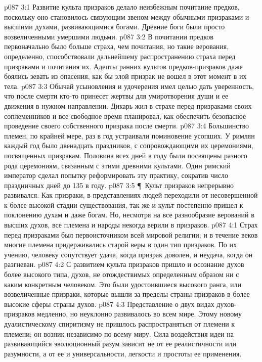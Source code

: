 \vs p087 3:1 Развитие культа призраков делало неизбежным почитание предков, поскольку оно становилось связующим звеном между обычными призраками и высшими духами, развивающимися богами. Древние боги были просто возвеличенными умершими людьми.
\vs p087 3:2 В почитании предков первоначально было больше страха, чем почитания, но такие верования, определенно, способствовали дальнейшему распространению страха перед призраками и почитания их. Адепты ранних культов предков\hyp{}призраков даже боялись зевать из опасения, как бы злой призрак не вошел в этот момент в их тела.
\vs p087 3:3 Обычай усыновления и удочерения имел целью дать уверенность, что после смерти кто\hyp{}то принесет жертвы для умиротворения души и ее движения в нужном направлении. Дикарь жил в страхе перед призраками своих соплеменников и все свободное время планировал, как обеспечить безопасное проведение своего собственного призрака после смерти.
\vs p087 3:4 Большинство племен, по крайней мере, раз в год устраивали поминовение усопших. У римлян каждый год было двенадцать праздников, с сопровождающими их церемониями, посвященных призракам. Половина всех дней в году были посвящены разного рода церемониям, связанным с этими древними культами. Один римский император сделал попытку реформировать эту практику, сократив число праздничных дней до 135 в году.
\vs p087 3:5 \P\ Культ призраков непрерывно развивался. Как призраки, в представлениях людей переходили от несовершенной к более высокой стадии существования, так же и культ постепенно пришел к поклонению духам и даже богам. Но, несмотря на все разнообразие верований в высших духов, все племена и народы некогда верили в призраков.
\vs p087 4:1 Страх перед призраками был первоисточником всей мировой религии; и в течение веков многие племена придерживались старой веры в один тип призраков. По их учению, человеку сопутствует удача, когда призрак доволен, и неудача, когда он разгневан.
\vs p087 4:2 С развитием культа призраков пришло и осознание духов более высокого типа, духов, не отождествимых определенным образом ни с каким конкретным человеком. Это были удостоившиеся высокого ранга, или возвеличенные призраки, которые вышли за пределы страны призраков в более высокие сферы страны духов.
\vs p087 4:3 Представление о двух видах духов\hyp{}призраков медленно, но неуклонно развивалось во всем мире. Этому новому дуалистическому спиритизму не пришлось распространяться от племени к племени; он возник независимо по всему миру. Сила воздействия идеи на развивающийся эволюционный разум зависит не от ее реалистичности или разумности, а от ее  и универсальности, легкости и простоты ее применения.

